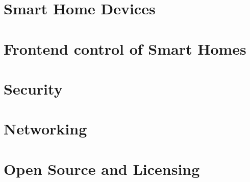 \section{Smart Home Devices} \label{sec:chap2:devices}
\section{Frontend control of Smart Homes} \label{sec:chap2:frontend}
\section{Security} \label{sec:chap2:security}
\section{Networking} \label{sec:chap2:networking}
\section{Open Source and Licensing} \label{sec:chap2:opensource}

